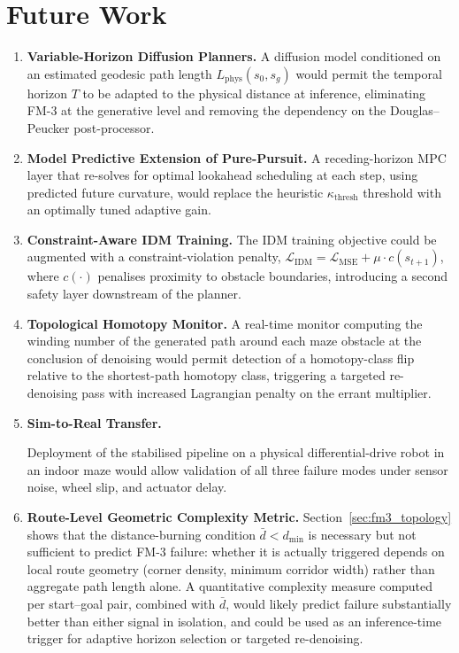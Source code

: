 \documentclass[12pt, a4paper, oneside]{report}
\theoremstyle{definition}
\begin{document}
\chapter{Future Work}
\label{chap:future}

\begin{enumerate}[label=\textbf{FW\arabic*.},
                  leftmargin=*, itemsep=10pt]

\item \textbf{Variable-Horizon Diffusion Planners.}
  A diffusion model conditioned on an estimated geodesic path
  length $L_{\mathrm{phys}}(s_0, s_g)$ would permit the temporal
  horizon $T$ to be adapted to the physical distance at inference,
  eliminating FM-3 at the generative level and removing the
  dependency on the Douglas--Peucker post-processor.

\item \textbf{Model Predictive Extension of Pure-Pursuit.}
  A receding-horizon MPC layer that re-solves for optimal lookahead
  scheduling at each step, using predicted future curvature, would
  replace the heuristic $\kappa_{\mathrm{thresh}}$ threshold with an
  optimally tuned adaptive gain.

\item \textbf{Constraint-Aware IDM Training.}
  The IDM training objective could be augmented with a
  constraint-violation penalty,
  $\mathcal{L}_{\mathrm{IDM}} = \mathcal{L}_{\mathrm{MSE}}
  + \mu \cdot c(s_{t+1})$, where $c(\cdot)$ penalises proximity to
  obstacle boundaries, introducing a second safety layer downstream
  of the planner.

\item \textbf{Topological Homotopy Monitor.}
  A real-time monitor computing the winding number of the
  generated path around each maze obstacle at the conclusion of
  denoising would permit detection of a homotopy-class flip
  relative to the shortest-path homotopy class, triggering a
  targeted re-denoising pass with increased Lagrangian penalty on
  the errant multiplier.

\item \textbf{Sim-to-Real Transfer.}
  \begin{sloppypar}
  Deployment of the stabilised pipeline on a physical
  differential-drive robot in an indoor maze would allow validation
  of all three failure modes under sensor noise, wheel slip, and
  actuator delay.
  \end{sloppypar}

\item \textbf{Route-Level Geometric Complexity Metric.}
  Section~\ref{sec:fm3_topology} shows that the distance-burning
  condition $\bar{d} < d_{\min}$ is necessary but not sufficient to
  predict FM-3 failure: whether it is actually triggered depends on
  local route geometry (corner density, minimum corridor width)
  rather than aggregate path length alone. A quantitative
  complexity measure computed per start--goal pair, combined with
  $\bar{d}$, would likely predict failure substantially better than
  either signal in isolation, and could be used as an
  inference-time trigger for adaptive horizon selection or targeted
  re-denoising.

\end{enumerate}
\end{document}
